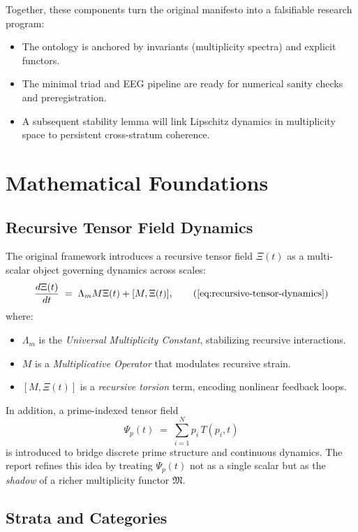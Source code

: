 \documentclass[11pt]{article}
\begin{document}
Together, these components turn the original manifesto into a falsifiable research program:

\begin{itemize}
  \item The ontology is anchored by invariants (multiplicity spectra) and explicit functors.
  \item The minimal triad and EEG pipeline are ready for numerical sanity checks and preregistration.
  \item A subsequent stability lemma will link Lipschitz dynamics in multiplicity space to persistent cross-stratum coherence.
\end{itemize}

\section{Mathematical Foundations}

\subsection{Recursive Tensor Field Dynamics}

The original framework introduces a recursive tensor field \(\Xi(t)\) as a multi-scalar object governing dynamics across scales:
\begin{equation}
  \frac{d\Xi(t)}{dt} \;=\; \Lambda_m M \Xi(t) + [M,\Xi(t)], \tag{\ref{eq:recursive-tensor-dynamics}}
\end{equation}
where:
\begin{itemize}
  \item \(\Lambda_m\) is the \emph{Universal Multiplicity Constant}, stabilizing recursive interactions.
  \item \(M\) is a \emph{Multiplicative Operator} that modulates recursive strain.
  \item \([M,\Xi(t)]\) is a \emph{recursive torsion} term, encoding nonlinear feedback loops.
\end{itemize}

In addition, a prime-indexed tensor field
\begin{equation}
  \Psi_p(t) \;=\; \sum_{i=1}^N p_i \, T(p_i,t)
\end{equation}
is introduced to bridge discrete prime structure and continuous dynamics. The report refines this idea by treating \(\Psi_p(t)\) not as a single scalar but as the \emph{shadow} of a richer multiplicity functor \(\mathfrak{M}\).

\subsection{Strata and Categories}
\end{document}
